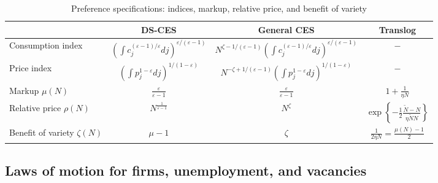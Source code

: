 \documentclass[authoryear, review, 12pt]{elsarticle}
\begin{document}
	\begin{table}[H]
		\centering
		\begin{tabular}{l|ccc}
			\toprule
			& DS-CES & General CES & Translog \\
			\midrule
			Consumption index 
			& $\left(\int c_j^{(\varepsilon-1)/\varepsilon}dj
			\right)^{\varepsilon/(\varepsilon-1)}$ 
			& $N^{\zeta-1/(\varepsilon-1)}\left(\int 
			c_j^{(\varepsilon-1)/\varepsilon}dj
			\right)^{\varepsilon/(\varepsilon-1)}$ 
			& $-$ \\
			Price index 
			& $\left(\int p_j^{1-\varepsilon}dj
			\right)^{1/(1-\varepsilon)}$ 
			& $N^{-\zeta+1/(\varepsilon-1)}\left(\int 
			p_j^{1-\varepsilon}dj\right)^{1/(1-\varepsilon)}$ 
			& $-$ \\
			Markup $\mu(N)$ 
			& $\frac{\varepsilon}{\varepsilon-1}$ 
			& $\frac{\varepsilon}{\varepsilon-1}$ 
			& $1+\frac{1}{\eta N}$ \\
			Relative price $\rho(N)$ 
			& $N^{\frac{1}{\varepsilon-1}}$ 
			& $N^{\zeta}$ 
			& $\exp\left\{-\frac{1}{2}
			\frac{\tilde{N}-N}{\eta \tilde{N}N}\right\}$ \\
			Benefit of variety $\zeta(N)$ 
			& $\mu-1$ 
			& $\zeta$ 
			& $\frac{1}{2\eta N}=\frac{\mu(N)-1}{2}$ \\
			\bottomrule
		\end{tabular}
		\caption{Preference specifications: indices, markup, relative 
			price, and benefit of variety}
		\label{tab:preference_specifications}
	\end{table}
	
	\subsection{Laws of motion for firms, unemployment, and vacancies}
	
\end{document}
